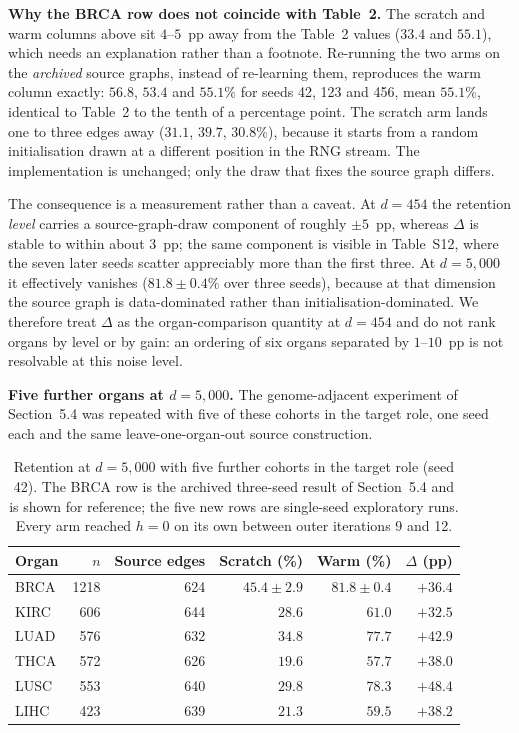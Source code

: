 \documentclass[11pt]{article}
\begin{document}
\smallskip\noindent\textbf{Why the BRCA row does not coincide with Table~2.} The scratch
and warm columns above sit $4$--$5$~pp away from the Table~2 values ($33.4$ and
$55.1$), which needs an explanation rather than a footnote. Re-running the two arms on
the \emph{archived} source graphs, instead of re-learning them, reproduces the warm
column exactly: $56.8$, $53.4$ and $55.1\%$ for seeds 42, 123 and 456, mean $55.1\%$,
identical to Table~2 to the tenth of a percentage point. The scratch arm lands one to
three edges away ($31.1$, $39.7$, $30.8\%$), because it starts from a random
initialisation drawn at a different position in the RNG stream. The implementation is
unchanged; only the draw that fixes the source graph differs.

The consequence is a measurement rather than a caveat. At $d=454$ the retention
\emph{level} carries a source-graph-draw component of roughly $\pm5$~pp, whereas
$\Delta$ is stable to within about $3$~pp; the same component is visible in Table~S12,
where the seven later seeds scatter appreciably more than the first three. At
$d=5{,}000$ it effectively vanishes ($81.8\pm0.4\%$ over three seeds), because at that
dimension the source graph is data-dominated rather than initialisation-dominated. We
therefore treat $\Delta$ as the organ-comparison quantity at $d=454$ and do not rank
organs by level or by gain: an ordering of six organs separated by $1$--$10$~pp is not
resolvable at this noise level.

\smallskip\noindent\textbf{Five further organs at $d=5{,}000$.} The genome-adjacent
experiment of Section~5.4 was repeated with five of these cohorts in the target role,
one seed each and the same leave-one-organ-out source construction.

\setcounter{table}{13}
\begin{table}[H]
\caption{Retention at $d=5{,}000$ with five further cohorts in the target role (seed
42). The BRCA row is the archived three-seed result of Section~5.4 and is shown for
reference; the five new rows are single-seed exploratory runs. Every arm reached
$h=0$ on its own between outer iterations 9 and 12.}
\begin{tabular}{@{}lrrrrr@{}}
\toprule
Organ & $n$ & Source edges & Scratch (\%) & Warm (\%) & $\Delta$ (pp)\\
\midrule
BRCA & 1218 & 624 & $45.4\pm2.9$ & $81.8\pm0.4$ & $+36.4$ \\
KIRC & 606 & 644 & $28.6$ & $61.0$ & $+32.5$ \\
LUAD & 576 & 632 & $34.8$ & $77.7$ & $+42.9$ \\
THCA & 572 & 626 & $19.6$ & $57.7$ & $+38.0$ \\
LUSC & 553 & 640 & $29.8$ & $78.3$ & $+48.4$ \\
LIHC & 423 & 639 & $21.3$ & $59.5$ & $+38.2$ \\
\bottomrule
\end{tabular}
\label{tab:S14}
\end{table}
\end{document}
